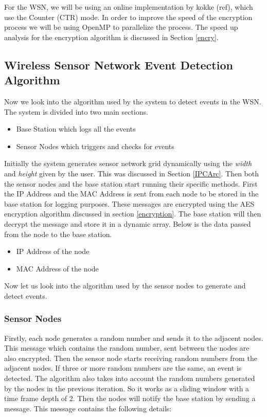 \documentclass[conference]{IEEEtran}
\begin{document}
	
	For the WSN, we will be using an online implementation by kokke (ref), which use the Counter (CTR) mode. In order to improve the speed of the encryption process we will be using OpenMP to parallelize the process. The speed up analysis for the encryption algorithm is discussed in Section \ref{encry}.
	
	
	\subsection{ Wireless Sensor Network Event Detection Algorithm }
	
	
	Now we look into the algorithm used by the system to detect events in the WSN. The system is divided into two main sections.
	
	\begin{itemize}
		\item Base Station which logs all the events
		\item Sensor Nodes which triggers and checks for events
	\end{itemize}

	Initially the system generates sensor network grid dynamically using the \emph{width} and \emph{height} given by the user. This was discussed in Section \ref{IPCArc}. Then both the sensor nodes and the base station start running their specific methods. First the IP Address and the MAC Address is sent from each node to be stored in the base station for logging purposes. These messages are encrypted using the AES encryption algorithm discussed in section \ref{encryption}. The base station will then decrypt the message and store it in a dynamic array. Below is the data passed from the node to the base station.
	
		\begin{itemize}
		\item IP Address of the node
		\item MAC Address of the node
	\end{itemize}
	
	Now let us look into the algorithm used by the sensor nodes to generate and detect events.
	
	\subsubsection{Sensor Nodes}
	
	Firstly, each node generates a random number and sends it to the adjacent nodes. This message which contains the random number, sent between the nodes are also encrypted. Then the sensor node starts receiving random numbers from the adjacent nodes. If three or more random numbers are the same, an event is detected. The algorithm also takes into account the random numbers generated by the nodes in the previous iteration. So it works as a sliding window with a time frame depth of 2. Then the nodes will notify the base station by sending a message. This message contains the following details:
	
\end{document}
